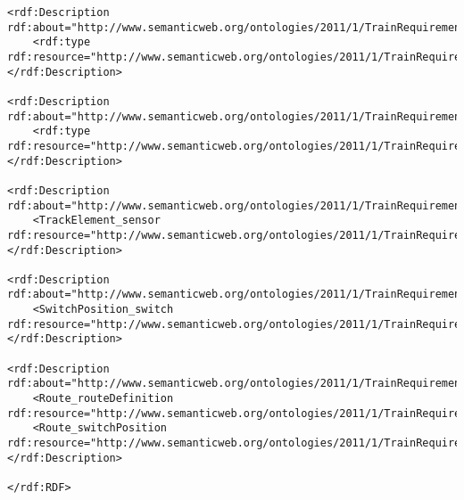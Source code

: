 \begin{lstlisting}[caption=A graph based on the railway system metamodel stored in RDF format]
<rdf:Description rdf:about="http://www.semanticweb.org/ontologies/2011/1/TrainRequirementOntology.owl#3">
	<rdf:type rdf:resource="http://www.semanticweb.org/ontologies/2011/1/TrainRequirementOntology.owl#Switch"/>
</rdf:Description>

<rdf:Description rdf:about="http://www.semanticweb.org/ontologies/2011/1/TrainRequirementOntology.owl#4">
	<rdf:type rdf:resource="http://www.semanticweb.org/ontologies/2011/1/TrainRequirementOntology.owl#SwitchPosition"/>
</rdf:Description>

<rdf:Description rdf:about="http://www.semanticweb.org/ontologies/2011/1/TrainRequirementOntology.owl#3">
	<TrackElement_sensor rdf:resource="http://www.semanticweb.org/ontologies/2011/1/TrainRequirementOntology.owl#1"/>
</rdf:Description>

<rdf:Description rdf:about="http://www.semanticweb.org/ontologies/2011/1/TrainRequirementOntology.owl#4">
	<SwitchPosition_switch rdf:resource="http://www.semanticweb.org/ontologies/2011/1/TrainRequirementOntology.owl#3"/>
</rdf:Description>

<rdf:Description rdf:about="http://www.semanticweb.org/ontologies/2011/1/TrainRequirementOntology.owl#2">
	<Route_routeDefinition rdf:resource="http://www.semanticweb.org/ontologies/2011/1/TrainRequirementOntology.owl#1"/>
	<Route_switchPosition rdf:resource="http://www.semanticweb.org/ontologies/2011/1/TrainRequirementOntology.owl#4"/>
</rdf:Description>

</rdf:RDF>
\end{lstlisting}
